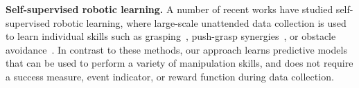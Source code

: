 
\noindent \textbf{Self-supervised robotic learning.}
A number of recent works have studied self-supervised robotic learning, where large-scale unattended data collection is used to learn individual skills such as grasping~\cite{lerrel,google_handeye, calandra2017feeling,pinto2016curious}, push-grasp synergies~\cite{zeng2018learning}, or obstacle avoidance~\cite{greg_kahn_uncertainty,crashing}. 
In contrast to these methods, our approach learns predictive models that can be used to perform a variety of manipulation skills, and does not require a success measure, event indicator, or reward function during data collection.

